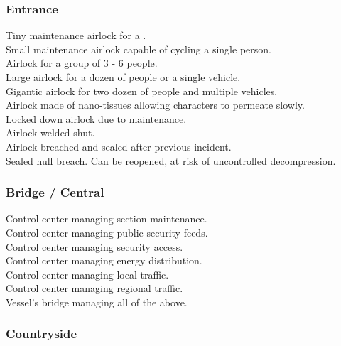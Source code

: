 \documentclass[a4]{article}
\begin{document}
\subsubsection{Entrance}

\starttableone
Tiny maintenance airlock for a .\\
Small maintenance airlock capable of cycling a single person.\\
Airlock for a group of 3 - 6 people.\\
Large airlock for a dozen of people or a single vehicle.\\
Gigantic airlock for two dozen of people and multiple vehicles.\\
Airlock made of nano-tissues allowing characters to permeate slowly.\\
Locked down airlock due to maintenance.\\
Airlock welded shut.\\
Airlock breached and sealed after previous incident.\\
Sealed hull breach. Can be reopened, at risk of uncontrolled decompression.\\
\stoptableone



\subsubsection{Bridge / Central}

\starttableone
Control center managing section maintenance.\\
Control center managing public security feeds.\\
Control center managing security access.\\
Control center managing energy distribution.\\
Control center managing local traffic.\\
Control center managing regional traffic.\\
Vessel's bridge managing all of the above.\\
\stoptableone




\subsubsection{Countryside}
\end{document}
